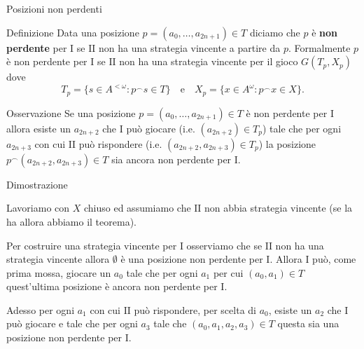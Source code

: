 \documentclass[aspectratio=43]{beamer}
\begin{document}
\begin{frame}{Posizioni non perdenti}
    \begin{block}{Definizione}
    Data una posizione \(p = (a_0, \ldots, a_{2n+1}) \in T\) diciamo che \(p\) è \textbf{non perdente} per \(\mathrm{I}\) se \(\mathrm{II}\) non ha una strategia vincente a partire da \(p\).
    Formalmente \(p\) è non perdente per \(\mathrm{I}\) se \(\mathrm{II}\) non ha una strategia vincente per il gioco \(G(T_p, X_p)\)     dove
    \begin{equation*}
      T_p = \{ s \in A^{<\omega} : p^\smallfrown s \in T\} \quad \text{e} \quad X_p = \{x \in A^\omega : p^\smallfrown x \in X\}.
    \end{equation*}
  \end{block}
  \pause
  \begin{block}{Osservazione}
    Se una posizione \(p = (a_0, \ldots, a_{2n+1}) \in T\) è non perdente per \(\mathrm{I}\) allora esiste un \(a_{2n + 2}\) che \(\mathrm{I}\) può giocare (i.e. \((a_{2n +2}) \in T_p\)) tale che per ogni \(a_{2n + 3}\) con cui \(\mathrm{II}\) può rispondere (i.e. \((a_{2n + 2}, a_{2n + 3}) \in T_p\)) la posizione \(p^\smallfrown (a_{2n + 2}, a_{2n + 3}) \in T\) sia ancora non perdente per \(\mathrm{I}\).
  \end{block}
\end{frame}

\begin{frame}{Dimostrazione}
  \begin{block}{}
    Lavoriamo con \(X\) chiuso ed assumiamo che \(\mathrm{II}\) non abbia strategia vincente (se la ha allora abbiamo il teorema).
  \end{block}
  \pause

  \begin{block}{}
    Per costruire una strategia vincente per \(\mathrm{I}\) osserviamo che se \(\mathrm{II}\) non ha una strategia vincente allora \(\emptyset\) è una posizione non perdente per \(\mathrm{I}\).
    Allora \(\mathrm{I}\) può, come prima mossa, giocare un \(a_0\) tale che per ogni \(a_1\) per cui \((a_0, a_1) \in T\) quest'ultima posizione è ancora non perdente per \(\mathrm{I}\).
  \end{block}
  \pause

  \begin{block}{}
    Adesso per ogni \(a_1\) con cui \(\mathrm{II}\) può rispondere, per scelta di \(a_0\), esiste un \(a_2\) che \(\mathrm{I}\) può giocare e tale che per ogni \(a_3\) tale che \((a_0, a_1, a_2, a_3) \in T\) questa sia una posizione non perdente per \(\mathrm{I}\).
  \end{block}
\end{frame}
\end{document}
